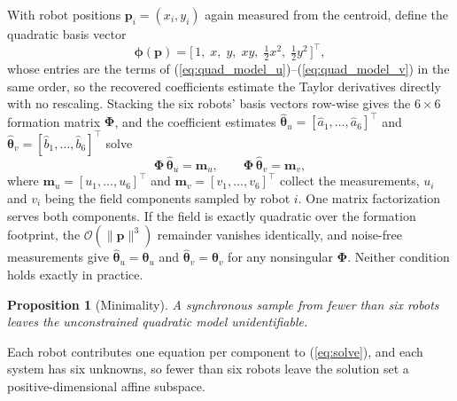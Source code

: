 \documentclass[lettersize,journal]{IEEEtran}
\newtheorem{proposition}{Proposition}
\begin{document}
With robot positions $\mathbf{p}_i = (x_i, y_i)$ again measured from the
centroid, define the quadratic basis vector
\begin{equation}
    \boldsymbol{\phi}(\mathbf{p}) =
    \bigl[\,1, \; x, \; y, \; xy, \;
    \tfrac{1}{2}x^2, \; \tfrac{1}{2}y^2\,\bigr]^\top,
\end{equation}
whose entries are the terms of
(\ref{eq:quad_model_u})--(\ref{eq:quad_model_v}) in the same order, so
the recovered coefficients estimate the Taylor derivatives directly with
no rescaling. Stacking the six robots' basis vectors row-wise gives
the $6 \times 6$ formation matrix $\boldsymbol{\Phi}$, and the coefficient
estimates $\hat{\boldsymbol{\theta}}_u = [\hat{a}_1, \ldots,
\hat{a}_6]^\top$ and $\hat{\boldsymbol{\theta}}_v = [\hat{b}_1, \ldots,
\hat{b}_6]^\top$ solve
\begin{equation}
    \boldsymbol{\Phi}\,\hat{\boldsymbol{\theta}}_u = \mathbf{m}_u, \qquad
    \boldsymbol{\Phi}\,\hat{\boldsymbol{\theta}}_v = \mathbf{m}_v,
    \label{eq:solve}
\end{equation}
where $\mathbf{m}_u = [u_1, \ldots, u_6]^\top$ and
$\mathbf{m}_v = [v_1, \ldots, v_6]^\top$ collect the measurements, $u_i$
and $v_i$ being the field components sampled by robot $i$. One matrix
factorization serves both components. If the field is exactly quadratic
over the formation footprint, the $\mathcal{O}(\|\mathbf{p}\|^3)$
remainder vanishes identically, and noise-free measurements give
$\hat{\boldsymbol{\theta}}_u = \boldsymbol{\theta}_u$ and
$\hat{\boldsymbol{\theta}}_v = \boldsymbol{\theta}_v$ for any nonsingular
$\boldsymbol{\Phi}$. Neither condition holds exactly in practice.

\begin{proposition}[Minimality]
\label{prop:minimality}
A synchronous sample from fewer than six robots leaves the
unconstrained quadratic model unidentifiable.
\end{proposition}

\begin{IEEEproof}
Each robot contributes one equation per component to (\ref{eq:solve}),
and each system has six unknowns, so fewer than six robots leave the
solution set a positive-dimensional affine subspace.
\end{IEEEproof}
\end{document}
